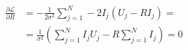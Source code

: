 \documentclass[A4,11pt]{article}
\begin{document}
\thispagestyle{empty}

\begin{align*}
\frac{\partial\mathcal{L}}{\partial R} &=  -\frac{1}{2\sigma^2}\sum\limits_{j=1}^N -2I_j (U_j- R I_j) = \\
                                       &= \frac{1}{\sigma^2}\left(\sum\limits_{j=1}^N I_jU_j - R\sum\limits_{j=1}^N I_j\right) = 0
\end{align*}
\end{document}
